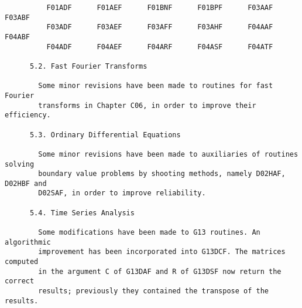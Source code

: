 \begin{small}
\begin{verbatim}
          F01ADF      F01AEF      F01BNF      F01BPF      F03AAF      F03ABF     
          F03ADF      F03AEF      F03AFF      F03AHF      F04AAF      F04ABF     
          F04ADF      F04AEF      F04ARF      F04ASF      F04ATF                 
                                                                                 
      5.2. Fast Fourier Transforms                                               
                                                                                 
        Some minor revisions have been made to routines for fast Fourier         
        transforms in Chapter C06, in order to improve their efficiency.         
                                                                                 
      5.3. Ordinary Differential Equations                                       
                                                                                 
        Some minor revisions have been made to auxiliaries of routines solving   
        boundary value problems by shooting methods, namely D02HAF, D02HBF and   
        D02SAF, in order to improve reliability.                                 
                                                                                 
      5.4. Time Series Analysis                                                  
                                                                                 
        Some modifications have been made to G13 routines. An algorithmic        
        improvement has been incorporated into G13DCF. The matrices computed     
        in the argument C of G13DAF and R of G13DSF now return the correct       
        results; previously they contained the transpose of the results.         
\end{verbatim}
\end{small}


